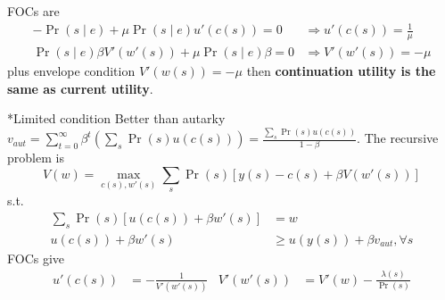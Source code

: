 \documentclass[10pt,a4paper]{article}
\makeatletter
\renewcommand{\subsubsection}{\@startsection{subsubsection}{1}{0mm}{.2ex}{.2ex}{\bfseries}}
\makeatother
\begin{document}
\begin{multicols*}{3}

FOCs are 
\begin{align*}
    -\Pr(s\mid e) +\mu\Pr(s\mid e)u'(c(s))=0 &\Rightarrow u'(c(s))=\frac{1}{\mu} \\
    \Pr(s\mid e)\beta V'(w'(s)) + \mu\Pr(s\mid e)\beta =0 &\Rightarrow V'(w'(s)) = -\mu
\end{align*}
plus envelope condition 
{\color{myblue}$
V'(w(s))=-\mu
$}
then \textbf{continuation utility is the {\color{myblue}same} as current utility}.

\vspace{4pt}
\subsubsection*{Limited condition}
Better than autarky $v_{aut}=\sum^{\infty}_{t=0}\beta^t \left(\sum_s \Pr(s)u(c(s))\right) = \frac{\sum_s\Pr(s)u(c(s))}{1-\beta}$. The recursive problem is 
$$
V(w) = \max_{c(s),w'(s)}\sum_s \Pr(s) \left[ y(s)-c(s) + \beta V(w'(s)) \right]
$$
s.t.
\begin{align*}
    \sum_s \Pr(s)\left[ u(c(s))+\beta w'(s) \right] &= w \\
    u(c(s)) + \beta w'(s) &\geq u(y(s))+\beta v_{aut}, \forall s
\end{align*}
FOCs give
\begin{align*}
    u'(c(s)) &= -\frac{1}{V'(w'(s))} & V'(w'(s)) &= V'(w) -\frac{\lambda(s)}{\Pr(s)}
\end{align*}


\end{multicols*}
\end{document}

